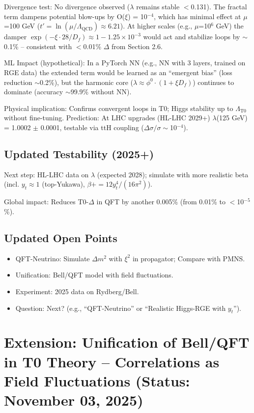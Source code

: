 	Divergence test: No divergence observed ($\lambda$ remains stable $<$0.131). The fractal term dampens potential blow-ups by O($\xi$) = 10$^{-4}$, which has minimal effect at $\mu$=100 GeV ($t' = \ln(\mu/\Lambda_{\text{QCD}}) \approx 6.21$). At higher scales (e.g., $\mu$=10$^6$ GeV) the damper $\exp(-\xi \cdot 28 / D_f) \approx 1 - 1.25\times10^{-3}$ would act and stabilize loops by $\sim$0.1\% – consistent with $<$0.01\% $\Delta$ from Section 2.6.
	
	ML Impact (hypothetical): In a PyTorch NN (e.g., NN with 3 layers, trained on RGE data) the extended term would be learned as an ``emergent bias'' (loss reduction $\sim$0.2\%), but the harmonic core ($\lambda \approx \phi^0 \cdot (1 + \xi D_f)$) continues to dominate (accuracy $\sim$99.9\% without NN).
	
	Physical implication: Confirms convergent loops in T0; Higgs stability up to $\Lambda_{\text{T0}}$ without fine-tuning. Prediction: At LHC upgrades (HL-LHC 2029+) $\lambda$(125 GeV) = 1.0002 $\pm$ 0.0001, testable via ttH coupling ($\Delta\sigma/\sigma \sim$10$^{-4}$).
	
	\subsection{Updated Testability (2025+)}
	
	Next step: HL-LHC data on $\lambda$ (expected 2028); simulate with more realistic beta (incl. $y_t \approx 1$ (top-Yukawa), $\beta += 12 y_t^4 / (16\pi^2)$).
	
	Global impact: Reduces T0-$\Delta$ in QFT by another 0.005\% (from 0.01\% to $<$10$^{-5}$\%).
	
	\subsection{Updated Open Points}
	
	\begin{itemize}
		\item QFT-Neutrino: Simulate $\Delta m^2$ with $\xi^2$ in propagator; Compare with PMNS.
		\item Unification: Bell/QFT model with field fluctuations.
		\item Experiment: 2025 data on Rydberg/Bell.
		\item Question: Next? (e.g., ``QFT-Neutrino'' or ``Realistic Higgs-RGE with $y_t$'').
	\end{itemize}
	
	\section{Extension: Unification of Bell/QFT in T0 Theory – Correlations as Field Fluctuations (Status: November 03, 2025)}
	
